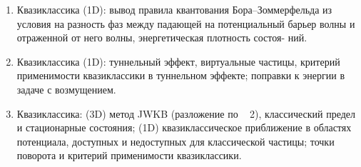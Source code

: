 \begin{enumerate}
\item Квазиклассика (1D): вывод правила квантования Бора–Зоммерфельда
из условия на разность фаз между падающей на потенциальный барьер волны и отраженной от него волны, энергетическая плотность состоя-
ний.

\item Квазиклассика (1D): туннельный эффект, виртуальные частицы, критерий применимости квазиклассики в туннельном эффекте; поправки к энергии в задаче с возмущением.

\item Квазиклассика: (3D) метод JWKB (разложение по ~ 2), классический предел и стационарные состояния; (1D) квазиклассическое приближение в областях потенциала, доступных и недоступных для классической частицы; точки поворота и критерий применимости квазиклассики.
\end{enumerate}